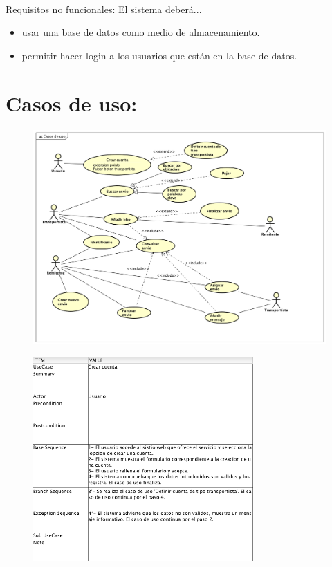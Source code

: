 \documentclass[10pt, a4paper,spanish]{article}
\begin{document}
			\paragraph{}
			Requisitos no funcionales: El sistema deberá...

				\begin{itemize}
					\item usar una base de datos como medio de almacenamiento.
					\item permitir hacer login a los usuarios que están en la base de datos.
				\end{itemize}
	\section{Casos de uso:}


		\begin{figure}[H]
			\centering
				\includegraphics[width=\textwidth]{astah/casos_de_uso.png}
		\end{figure}

		\begin{figure}[H]
			\centering
				\includegraphics[width=0.75\textwidth]{astah/use_case_crear_cuenta.png}
		\end{figure}
\end{document}
